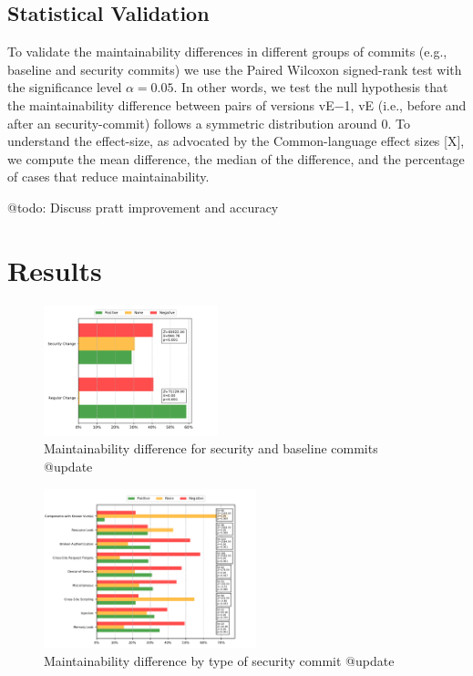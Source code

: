\documentclass[10pt,conference]{IEEEtran}
\begin{document}
\subsection{Statistical Validation}\label{sec:statsval}

To validate the maintainability differences in different groups of commits (e.g., baseline and security commits) we use the Paired Wilcoxon signed-rank test with the significance level $\alpha = 0.05$. In other words, we test the null hypothesis that the maintainability difference between pairs of versions vE−1, vE (i.e., before and after an security-commit) follows a symmetric distribution around 0. To understand the effect-size, as advocated by the Common-language effect sizes [X], we compute the mean difference, the median of the difference, and the percentage of cases that reduce maintainability.

\textcolor{mypink3}{@todo: Discuss pratt improvement and accuracy}

\section{Results}

\begin{figure}[h]
 	\centering
 	\includegraphics[width=0.45\textwidth]{figures/maintainability.pdf}
 	\caption{Maintainability difference for security and baseline commits \textcolor{mypink3}{@update}}
\end{figure}

\begin{figure}[h]
 	\centering
 	\includegraphics[width=0.55\textwidth]{figures/category.pdf}
 	\caption{Maintainability difference by type of security commit \textcolor{mypink3}{@update}}
\end{figure}
\end{document}
